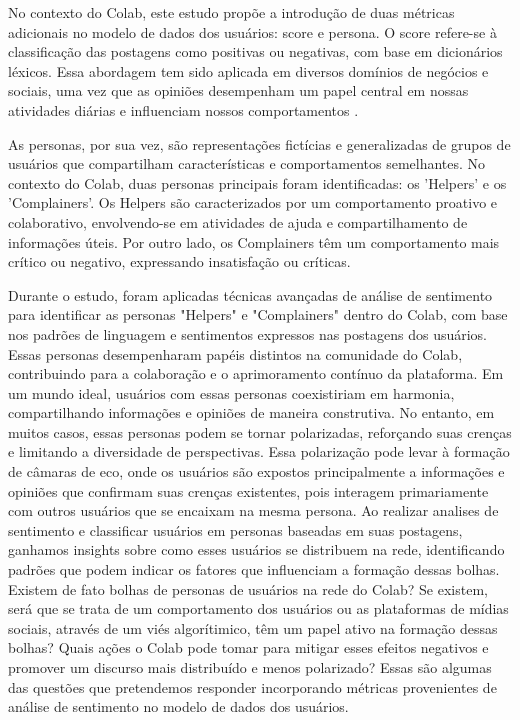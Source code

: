No contexto do Colab, este estudo propõe a introdução de duas métricas adicionais no modelo de dados dos usuários: score e persona. O score refere-se à classificação das postagens como positivas ou negativas, com base em dicionários léxicos. Essa abordagem tem sido aplicada em diversos domínios de negócios e sociais, uma vez que as opiniões desempenham um papel central em nossas atividades diárias e influenciam nossos comportamentos \cite{2012_Souza_IP}.

As personas, por sua vez, são representações fictícias e generalizadas de grupos de usuários que compartilham características e comportamentos semelhantes. No contexto do Colab, duas personas principais foram identificadas: os 'Helpers' e os 'Complainers'. Os Helpers são caracterizados por um comportamento proativo e colaborativo, envolvendo-se em atividades de ajuda e compartilhamento de informações úteis. Por outro lado, os Complainers têm um comportamento mais crítico ou negativo, expressando insatisfação ou críticas.

Durante o estudo, foram aplicadas técnicas avançadas de análise de sentimento para identificar as personas "Helpers" e "Complainers" dentro do Colab, com base nos padrões de linguagem e sentimentos expressos nas postagens dos usuários. Essas personas desempenharam papéis distintos na comunidade do Colab, contribuindo para a colaboração e o aprimoramento contínuo da plataforma. Em um mundo ideal, usuários com essas personas coexistiriam em harmonia, compartilhando informações e opiniões de maneira construtiva. No entanto, em muitos casos, essas personas podem se tornar polarizadas, reforçando suas crenças e limitando a diversidade de perspectivas. Essa polarização pode levar à formação de câmaras de eco, onde os usuários são expostos principalmente a informações e opiniões que confirmam suas crenças existentes, pois interagem primariamente com outros usuários que se encaixam na mesma persona. Ao realizar analises de sentimento e classificar usuários em personas baseadas em suas postagens, ganhamos insights sobre como esses usuários se distribuem na rede, identificando padrões que podem indicar os fatores que influenciam a formação dessas bolhas. Existem de fato bolhas de personas de usuários na rede do Colab? Se existem, será que se trata de um comportamento dos usuários ou as plataformas de mídias sociais, através de um viés algorítimico, têm um papel ativo na formação dessas bolhas? Quais ações o Colab pode tomar para mitigar esses efeitos negativos e promover um discurso mais distribuído e menos polarizado? Essas são algumas das questões que pretendemos responder incorporando métricas provenientes de análise de sentimento no modelo de dados dos usuários.

